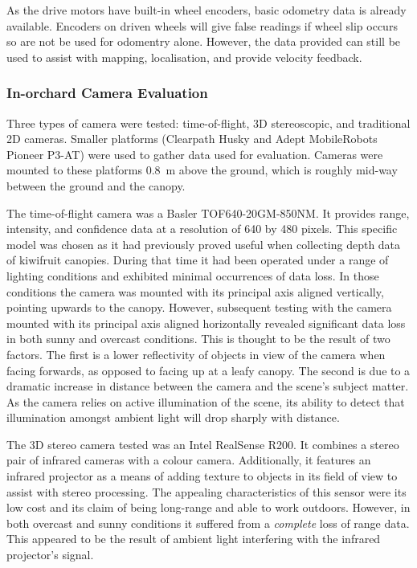 \documentclass[preprint,authoryear,12pt]{elsarticle}
\begin{document}
    As the drive motors have built-in wheel encoders, basic odometry data is already available.
    Encoders on driven wheels will give false readings if wheel slip occurs so are not be used for odomentry alone.
    However, the data provided can still be used to assist with mapping, localisation, and provide velocity feedback.


    \subsubsection{In-orchard Camera Evaluation}
        \label{sect:camera_evaluation}

        Three types of camera were tested: time-of-flight, 3D stereoscopic, and traditional 2D cameras.
        Smaller platforms (Clearpath Husky and Adept MobileRobots Pioneer P3-AT) were used to gather data used for evaluation.
        Cameras were mounted to these platforms \SI{0.8}{\meter} above the ground, which is roughly mid-way between the ground and the canopy.

        The time-of-flight camera was a Basler TOF640-20GM-850NM.
        It provides range, intensity, and confidence data at a resolution of 640 by 480 pixels.
        This specific model was chosen as it had previously proved useful when collecting depth data of kiwifruit canopies.
        During that time it had been operated under a range of lighting conditions and exhibited minimal occurrences of data loss.
        In those conditions the camera was mounted with its principal axis aligned vertically, pointing upwards to the canopy.
        However, subsequent testing with the camera mounted with its principal axis aligned horizontally revealed significant data loss in both sunny and overcast conditions.
        This is thought to be the result of two factors.
        The first is a lower reflectivity of objects in view of the camera when facing forwards, as opposed to facing up at a leafy canopy.
        The second is due to a dramatic increase in distance between the camera and the scene's subject matter.
        As the camera relies on active illumination of the scene, its ability to detect that illumination amongst ambient light will drop sharply with distance.

        The 3D stereo camera tested was an Intel RealSense R200.
        It combines a stereo pair of infrared cameras with a colour camera.
        Additionally, it features an infrared projector as a means of adding texture to objects in its field of view to assist with stereo processing.
        The appealing characteristics of this sensor were its low cost and its claim of being long-range and able to work outdoors.
        However, in both overcast and sunny conditions it suffered from a \emph{complete} loss of range data.
        This appeared to be the result of ambient light interfering with the infrared projector’s signal.
\end{document}
